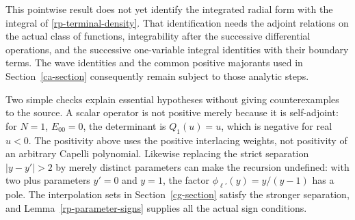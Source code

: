 This pointwise result does not yet identify the
integrated radial form with the integral of
\eqref{rp-terminal-density}.  That identification needs
the adjoint relations on the actual class of functions,
integrability after the successive differential
operations, and the successive one-variable integral
identities with their boundary terms.  The wave
identities and the common positive majorants used in
Section~\ref{ca-section} consequently remain subject to
those analytic steps.

Two simple checks explain essential hypotheses without
giving counterexamples to the source.  A scalar operator
is not positive merely because it is self-adjoint:
for $N=1$, $E_{00}=0$, the determinant is $Q_1(u)=u$,
which is negative for real $u<0$.
The positivity above uses the positive interlacing
weights, not positivity of an arbitrary Capelli
polynomial.  Likewise replacing the strict separation
$|y-y'|>2$ by merely distinct parameters can make the
recursion undefined: with two plus parameters $y'=0$
and $y=1$, the factor $\phi_{\ell'}(y)=y/(y-1)$
has a pole.  The interpolation sets in
Section~\ref{cg-section} satisfy the stronger separation,
and Lemma~\ref{rp-parameter-signs} supplies all the
actual sign conditions.



